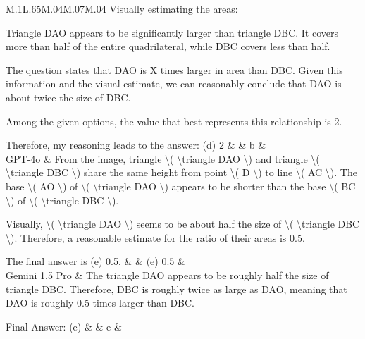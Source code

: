 \begin{table*}[t]
\begin{tabular}{M{.1\linewidth}L{.65\linewidth}M{.04\linewidth}M{.07\linewidth}M{.04\linewidth}}
Visually estimating the areas:

Triangle DAO appears to be significantly larger than triangle DBC. It covers more than half of the entire quadrilateral, while DBC covers less than half.

The question states that DAO is X times larger in area than DBC. Given this information and the visual estimate, we can reasonably conclude that DAO is about twice the size of DBC.

Among the given options, the value that best represents this relationship is 2.

Therefore, my reasoning leads to the answer: (d) 2 & \xmark & b & \xmark \\
\midrule
GPT-4o & From the image, triangle \textbackslash ( \textbackslash triangle DAO \textbackslash ) and triangle \textbackslash ( \textbackslash triangle DBC \textbackslash ) share the same height from point \textbackslash ( D \textbackslash ) to line \textbackslash ( AC \textbackslash ). The base \textbackslash ( AO \textbackslash ) of \textbackslash ( \textbackslash triangle DAO \textbackslash ) appears to be shorter than the base \textbackslash ( BC \textbackslash ) of \textbackslash ( \textbackslash triangle DBC \textbackslash ).

Visually, \textbackslash ( \textbackslash triangle DAO \textbackslash ) seems to be about half the size of \textbackslash ( \textbackslash triangle DBC \textbackslash ). Therefore, a reasonable estimate for the ratio of their areas is 0.5.

The final answer is (e) 0.5. & \cmark & (e) 0.5 & \cmark \\
\midrule
Gemini 1.5 Pro & The triangle DAO appears to be roughly half the size of triangle DBC.  Therefore, DBC is roughly twice as large as DAO, meaning that DAO is roughly 0.5 times larger than DBC.

Final Answer: (e) & \cmark & e & \cmark \\
\bottomrule
    \end{tabular}
    \caption{Examples of dataset and model responses for \texttt{Geometry-Area} (2)} \label{tab:examples_Geometry-Area_2}%
\end{table*}
%
%
%
\clearpage
%
%
%
